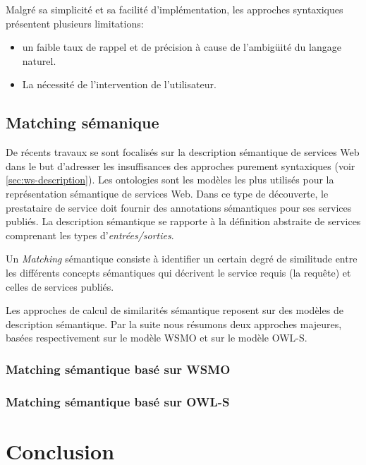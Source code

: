  Malgré sa simplicité et sa facilité d'implémentation, les approches
  syntaxiques présentent plusieurs limitations:

  \begin{itemize}
  \item un faible taux de rappel et de précision à cause de
    l'ambigüité du langage naturel.
  \item La nécessité de l'intervention de l'utilisateur.
  \end{itemize}

  \subsection{Matching sémanique}
  \label{sec:matching-semanique}
  De récents travaux se sont focalisés sur la description sémantique
  de services Web dans le but d'adresser les insuffisances des
  approches purement syntaxiques (voir \ref{sec:ws-description}). Les
  ontologies sont les modèles les plus utilisés pour la représentation
  sémantique de services Web. Dans ce type de découverte, le
  prestataire de service doit fournir des annotations sémantiques pour
  ses services publiés. La description sémantique se rapporte à la
  définition abstraite de services comprenant les types
  d'\textit{entrées/sorties}.

  Un \textit{Matching} sémantique consiste à identifier un certain
  degré de similitude entre les différents concepts sémantiques qui
  décrivent le service requis (la requête) et celles de services
  publiés.

  Les approches de calcul de similarités sémantique reposent sur des
  modèles de description sémantique. Par la suite nous résumons deux
  approches majeures, basées respectivement sur le modèle
  \textsc{WSMO} et sur le modèle \textsc{OWL-S}.

    \subsubsection{Matching sémantique basé sur WSMO}
    \label{sec:match-wsmo}
    \cite{paolucci2002semantic, keller2004wsmo}

    \subsubsection{Matching sémantique basé sur OWL-S}
    \label{sec:match-owls}
    \cite{paolucci2002semantic,benatallah2003request,
        benatallah2005automating, martin2004owl}

\newpage
\section{Conclusion}

